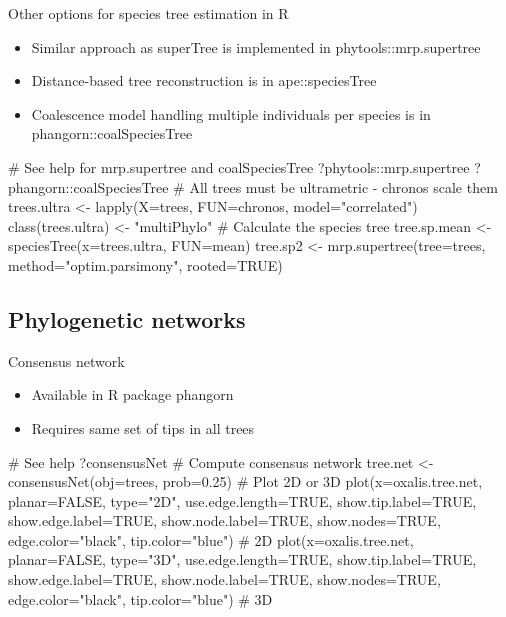 \documentclass[compress, ucs, xelatex, 11pt, xcolor=x11names, aspectratio=169,
	hyperref={
		bookmarks=true,
		unicode=true,
		colorlinks=true,
		pdftitle={HybSeq course},
		plainpages=false,
		pdfauthor={Vojtech Zeisek},
		pdfsubject={Practical processing of HybSeq target enrichment sequencing data on computing grids like MetaCentrum},
		pdfcreator={XeLaTeX},
		pdfkeywords={BASH, command line, GNU, HybSeq, Linux, MetaCentrum, sequencing shell, target enrichment},
		linkcolor=Turquoise4, %
		anchorcolor=DodgerBlue4, %
		citecolor=DodgerBlue4, %
		filecolor=DodgerBlue4, %
		menucolor=Tan4, %
		urlcolor=DarkOliveGreen4, %
		pdftex},
	url={hyphens, lowtilde} %
	]{beamer}
\renewcommand{\texttt}[1]{\colorbox{Cornsilk2}{{\ttfamily #1}}}
\begin{document}
\begin{frame}[fragile]{Other options for species tree estimation in R}
	\begin{itemize}
		\item Similar approach as \texttt{superTree} is implemented in \texttt{phytools::mrp.supertree}
		\item Distance-based tree reconstruction is in \texttt{ape::speciesTree}
		\item Coalescence model handling multiple individuals per species is in \texttt{phangorn::coalSpeciesTree}
	\end{itemize}
	\begin{spluscode}
    # See help for mrp.supertree and coalSpeciesTree
    ?phytools::mrp.supertree
    ?phangorn::coalSpeciesTree
    # All trees must be ultrametric - chronos scale them
    trees.ultra <- lapply(X=trees, FUN=chronos, model="correlated")
    class(trees.ultra) <- "multiPhylo"
    # Calculate the species tree
    tree.sp.mean <- speciesTree(x=trees.ultra, FUN=mean)
    tree.sp2 <- mrp.supertree(tree=trees, method="optim.parsimony",
      rooted=TRUE)
	\end{spluscode}
\end{frame}

\subsection{Phylogenetic networks}

\begin{frame}[fragile]{Consensus network}
	\begin{itemize}
		\item Available in \texttt{R} package \texttt{phangorn}
		\item Requires same set of tips in all trees
	\end{itemize}
	\begin{spluscode}
    # See help
    ?consensusNet
    # Compute consensus network
    tree.net <- consensusNet(obj=trees, prob=0.25)
    # Plot 2D or 3D
    plot(x=oxalis.tree.net, planar=FALSE, type="2D", use.edge.length=TRUE,
      show.tip.label=TRUE, show.edge.label=TRUE, show.node.label=TRUE,
      show.nodes=TRUE, edge.color="black", tip.color="blue") # 2D
    plot(x=oxalis.tree.net, planar=FALSE, type="3D", use.edge.length=TRUE,
      show.tip.label=TRUE, show.edge.label=TRUE, show.node.label=TRUE,
      show.nodes=TRUE, edge.color="black", tip.color="blue") # 3D
	\end{spluscode}
\end{frame}
\end{document}
